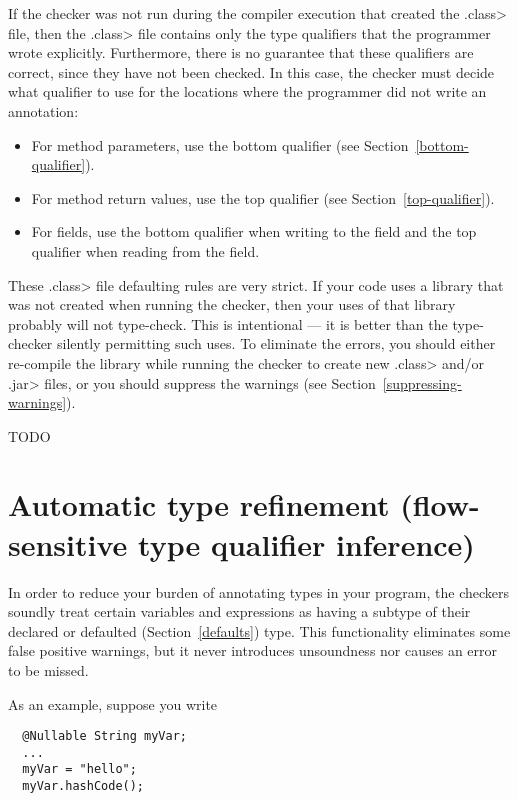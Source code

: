 If the checker was not run during the compiler execution that created the
\<.class> file, then the \<.class> file contains only the type qualifiers
that the programmer wrote explicitly.  Furthermore, there is no guarantee
that these qualifiers are correct, since they have not been checked.
In this case, the checker must decide what qualifier to use for the
locations where the programmer did not write an annotation:
\begin{itemize}
\item
  For method parameters, use the bottom qualifier (see
  Section~\ref{bottom-qualifier}).
\item
  For method return values, use the top qualifier (see 
  Section~\ref{top-qualifier}).
\item
  For fields, use the bottom qualifier when writing to the field and the
  top qualifier when reading from the field.
\end{itemize}

These \<.class> file defaulting rules are very strict.  If your code uses a
library that was not created when running the checker, then your uses of
that library probably will not type-check.  This is intentional --- it is
better than the type-checker silently permitting such uses.
To eliminate the errors, you should either re-compile the library while
running the checker to create new \<.class> and/or \<.jar> files, or you
should suppress the warnings (see Section~\ref{suppressing-warnings}).

TODO
\fi


\section{Automatic type refinement (flow-sensitive type qualifier inference)\label{type-refinement}}

In order to reduce your burden of annotating types in your program, the
checkers soundly treat certain variables and expressions as having a
subtype of their declared or defaulted (Section~\ref{defaults})
type.  This functionality eliminates some false positive warnings, but it
never introduces unsoundness nor causes an error to be missed.

As an example, suppose you write

\begin{Verbatim}
  @Nullable String myVar;
  ...
  myVar = "hello";
  myVar.hashCode();
\end{Verbatim}


